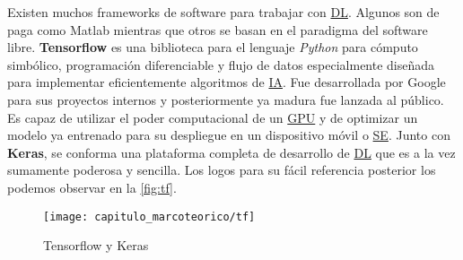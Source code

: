 Existen muchos frameworks de software para trabajar con \hyperlink{abbr}{DL}.
Algunos son de paga como Matlab mientras que otros se basan en el paradigma del
software libre. \textbf{Tensorflow} es una biblioteca para el lenguaje
\emph{Python} para cómputo simbólico, programación diferenciable y flujo de
datos especialmente diseñada para implementar eficientemente algoritmos de
\hyperlink{abbr}{IA}. Fue desarrollada por Google para sus proyectos internos y
posteriormente ya madura fue lanzada al público. Es capaz de utilizar el poder
computacional de un \hyperlink{abbr}{GPU} y de optimizar un modelo ya entrenado
para su despliegue en un dispositivo móvil o \hyperlink{abbr}{SE}. Junto con
\textbf{Keras}, se conforma una plataforma completa de desarrollo de
\hyperlink{abbr}{DL} que es a la vez sumamente poderosa y sencilla. Los logos
para su fácil referencia posterior los podemos observar en la \autoref{fig:tf}. 

\begin{figure}[H]
    \centering
    \texttt{[image: capitulo\_marcoteorico/tf]}
    \caption{Tensorflow y Keras}\label{fig:tf}
\end{figure}